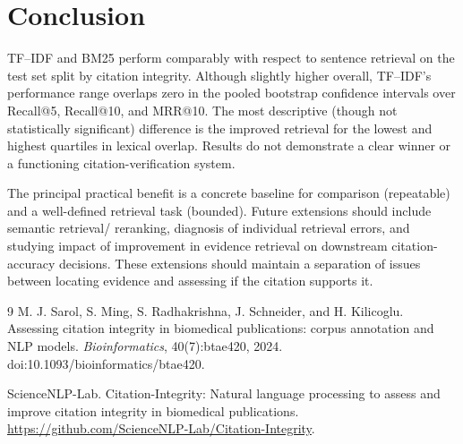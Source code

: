 \documentclass[11pt]{article}
\begin{document}
\section{Conclusion}
TF--IDF and BM25 perform comparably with respect to sentence retrieval on the test set split by citation integrity. Although slightly higher overall, TF--IDF's performance range overlaps zero in the pooled bootstrap confidence intervals over Recall@5, Recall@10, and MRR@10. The most descriptive (though not statistically significant) difference is the improved retrieval for the lowest and highest quartiles in lexical overlap. Results do not demonstrate a clear winner or a functioning citation-verification system.

The principal practical benefit is a concrete baseline for comparison (repeatable) and a well-defined retrieval task (bounded). Future extensions should include semantic retrieval/ reranking, diagnosis of individual retrieval errors, and studying impact of improvement in evidence retrieval on downstream citation-accuracy decisions. These extensions should maintain a separation of issues between locating evidence and assessing if the citation supports it.

\begin{thebibliography}{9}
M. J. Sarol, S. Ming, S. Radhakrishna, J. Schneider, and H. Kilicoglu.
\newblock Assessing citation integrity in biomedical publications: corpus annotation and NLP models.
\newblock \emph{Bioinformatics}, 40(7):btae420, 2024.
\newblock doi:10.1093/bioinformatics/btae420.

ScienceNLP-Lab.
\newblock Citation-Integrity: Natural language processing to assess and improve citation integrity in biomedical publications.
\newblock \url{https://github.com/ScienceNLP-Lab/Citation-Integrity}.
\end{thebibliography}
\end{document}
